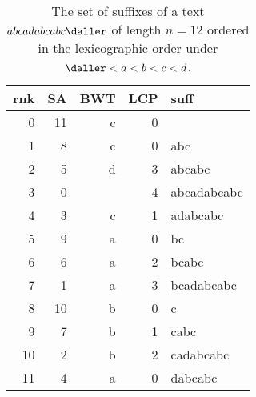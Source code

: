 \begin{table}[t]
\caption{
  The set of suffixes of a text $abcadabcabc\daller$ of length $n=12$ ordered in the lexicographic order under $\daller < a < b < c < d$. 
}
\ttfamily
\begin{tabular}{rr{2cm}rrl}
\toprule
rnk	& SA	& BWT	& LCP	& suff \\
\midrule
0	& 11	& c	& 0	& \daller \\
1	& 8	& c	& 0	& abc\daller \\
2	& 5	& d	& 3	& abcabc\daller \\
3	& 0	& \daller	& 4	& abcadabcabc\daller \\
4	& 3	& c	& 1	& adabcabc\daller \\
5	& 9	& a	& 0	& bc\daller \\
6	& 6	& a	& 2	& bcabc\daller \\
7	& 1	& a	& 3	& bcadabcabc\daller \\
8	& 10	& b	& 0	& c\daller \\
9	& 7	& b	& 1	& cabc\daller \\
10	& 2	& b	& 2	& cadabcabc\daller \\
11	& 4	& a	& 0	& dabcabc\daller \\
\bottomrule
\end{tabular}
\end{table}

